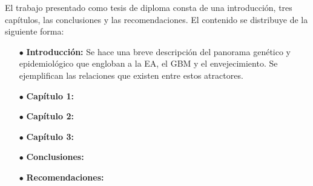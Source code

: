\alert{El trabajo presentado como tesis de diploma consta de una introducción, tres capítulos, las conclusiones y las recomendaciones. El contenido se distribuye de la siguiente forma:}

\begin{itemize}
	\item[$\bullet$] \textbf{Introducción:} Se hace una breve descripción del panorama genético y epidemiológico que engloban a la EA, el GBM y el envejecimiento. Se ejemplifican las relaciones que existen entre estos atractores.
	
	\item[$\bullet$] \textbf{Capítulo 1:} 
	
	\item[$\bullet$] \textbf{Capítulo 2:} 
	
	\item[$\bullet$] \textbf{Capítulo 3:} 
	
	\item[$\bullet$] \textbf{Conclusiones:} 
	
	\item[$\bullet$] \textbf{Recomendaciones:} 
	
	
\end{itemize}